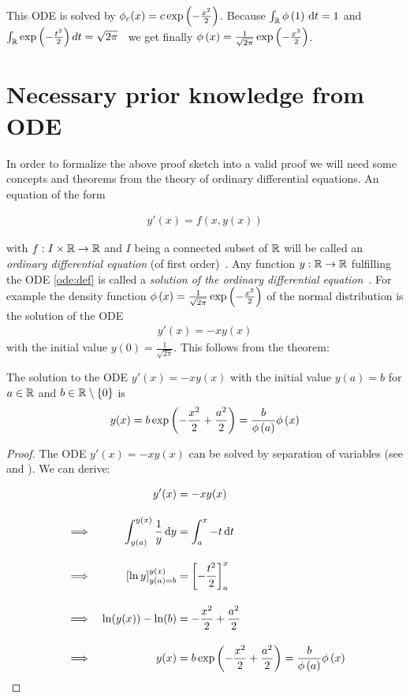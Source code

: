 This ODE is solved by $\phi_c(x) = c \exp\left( {-\frac{x^2}2} \right)$. Because $\int_\mathbb R \phi\left( {1} \right) \,\mathrm d{t} = 1$ and $\int_\mathbb R \exp\left( {-\frac{t^2}2} \right) d{t} = \sqrt{2\pi}$~\cite[p. 47]{georgii} we get finally $\phi\left( {x} \right) = \frac{1}{\sqrt{2\pi}} \exp\left( {-\frac{x^2}2} \right)$.

\section{Necessary prior knowledge from ODE}

In order to formalize the above proof sketch into a valid proof we will need some concepts and theorems from the theory of ordinary differential equations. An equation of the form

\begin{align} \label{ode:def}
  y'(x) = f(x,y(x))
\end{align}

with $f:I \times \mathbb R \to \mathbb R$ and $I$ being a connected subset of $\mathbb R$ will be called an \emph{ordinary differential equation} (of first order)~\cite[p. 465]{stoer}\cite{wiki:ode}. Any function $y:\mathbb R\to\mathbb R$ fulfilling the ODE \eqref{ode:def} is called a \emph{solution of the ordinary differential equation}~\cite[p. 8]{ricardo}\cite{wiki:ode}. For example the density function $\phi\left( {x} \right) = \frac{1}{\sqrt{2\pi}} \exp\left( {-\frac{x^2}2} \right)$ of the normal distribution is the solution of the ODE
\begin{align}
  y'(x) = -xy(x)
\end{align}
with the initial value $y(0) = \frac{1}{\sqrt{2\pi}}$. This follows from the theorem:

\begin{theorem} \label{chr_ode}
  The solution to the ODE $y'(x) = -xy(x)$ with the initial value $y(a)=b$ for $a\in\mathbb R$ and $b\in \mathbb R\setminus\{0\}$ is
  \begin{align}
    y(x) = b \exp\left( {-\frac{x^2}2+\frac{a^2}2} \right) = \frac{b}{\phi\left( {a} \right)} \phi\left( {x} \right)
  \end{align}
\end{theorem}

\begin{proof}
  The ODE $y'(x)=-xy(x)$ can be solved by separation of variables (see \cite[p. 28]{ricardo} and \cite{wiki:separation}). We can derive:

  \begin{align}
      && y'(x)& =-xy(x) \bnl
      &\implies & \int_{y(a)}^{y(x)} \frac 1y \d{y} & = \int_a^x -t \d{t} \bnl
      &\implies & \left[\ln{y}\right]^{y(x)}_{y(a)=b} & = \left[-\frac{t^2}2\right]_a^x \bnl
      &\implies & \ln(y(x))-\ln(b) &= -\frac{x^2}2 + \frac{a^2}2 \bnl
      &\implies & y(x) &= b \fexp{-\frac{x^2}2 + \frac{a^2}2} = \frac b{\fphi{a}}\fphi{x}
  \end{align}
\end{proof}

